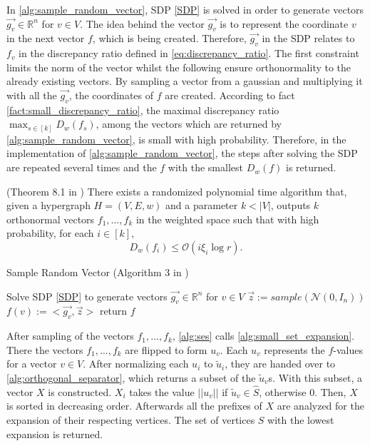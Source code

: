 In \cref{alg:sample_random_vector}, SDP \ref{SDP} is solved in order to generate vectors $\vec{g_v} \in \mathbb{R}^n $ for $v \in V$. The idea behind the vector $\vec{g_v}$ is to represent the coordinate $v$ in the next vector $f$, which is being created. Therefore, $\vec{g_v} $ in the SDP relates to $f_v $ in the discrepancy ratio defined in \cref{eq:discrepancy_ratio}. The first constraint limits the norm of the vector whilst the following ensure orthonormality to the already existing vectors. By sampling a vector from a gaussian and multiplying it with all the $\vec{g_v}$, the coordinates of $f$ are created. According to fact \ref{fact:small_discrepancy_ratio}, the maximal discrepancy ratio $ \max_{s \in [k]} D_w(f_s)$, among the vectors which are returned by \cref{alg:sample_random_vector}, is small with high probability. Therefore, in the implementation of \cref{alg:sample_random_vector}, the steps after solving the SDP are repeated several times and the $f$ with the smallest $D_w(f)$ is returned.

\begin{fact}{(Theorem 8.1 in \cite{ChanLTZ16}) \label{fact:small_discrepancy_ratio}}
There exists a randomized polynomial time algorithm that, given a hypergraph $H = (V,E,w)$ and a parameter $ k < |V |$, outputs $k$ orthonormal vectors $f_1, \ldots , f_k$ in the weighted space such that with high probability, for each $i  \in [k],$
\begin{equation}
	D_w(f_i) \le \mathcal{O} (i \xi_i \log r  ) .
\end{equation}	
\end{fact}

\begin{algorithm}[htpb]
	\caption{Sample Random Vector (Algorithm 3 in \cite{ChanLTZ16}) \label{alg:sample_random_vector}} 
	\begin{algorithmic}
		\State Solve SDP \ref{SDP} to generate vectors $\vec{g_v} \in \mathbb{R}^n $ for $v \in V$
		\State $\vec{z} := sample(\mathcal{N}(0,I_n))$
		\State $f(v) := <\vec{g_v}, \vec{z}>$
		\EndFor
		\State return $f$
		\EndFunction 
	\end{algorithmic}
\end{algorithm}	

After sampling of the vectors $f_1, \ldots, f_k$, \cref{alg:ses} calls \cref{alg:small_set_expansion}. There the vectors $f_1 , \ldots , f_k$ are flipped to form $u_v$. Each $u_v$ represents the $f$-values for a vector $v\in V$.
After normalizing each $u_i$ to $\tilde{u}_i $, they are handed over to \cref{alg:orthogonal_separator}, which returns a subset of the $\tilde{u}_v$s. With this subset, a vector $X$ is constructed. $X_i$  takes the value $||u_v||$ if $\tilde{u}_v \in \hat{S} $, otherwise $0$. Then, $X$ is sorted in decreasing order. 
Afterwards all the prefixes of $X$ are analyzed for the expansion of their respecting vertices. The set of vertices $S$ with the lowest expansion is returned.




